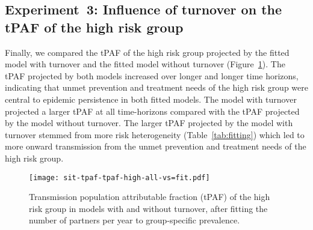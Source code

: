 \subsection{Experiment~3: Influence of turnover on the tPAF of the high risk group}
\label{ss:res-tpaf}
Finally, we compared the tPAF of the high risk group
projected by the fitted model with turnover and the fitted model without turnover
(Figure~\ref{fig:tpaf-fit}).
The tPAF projected by both models
increased over longer and longer time horizons,
indicating that unmet prevention and treatment needs of the high risk group
were central to epidemic persistence in both fitted models.
The model with turnover projected a larger tPAF at all
time-horizons compared with the tPAF projected by the model without turnover.
The larger tPAF projected by the model with turnover
stemmed from more risk heterogeneity (Table~\ref{tab:fitting})
which led to more onward transmission from the unmet
prevention and treatment needs of the high risk group.
\begin{figure}[!tbp]
  \centerline{\texttt{[image: sit-tpaf-tpaf-high-all-vs=fit.pdf]}}
  \caption{Transmission population attributable fraction (tPAF)
    of the high risk group in models with and without turnover,
    after fitting the number of partners per year to group-specific prevalence.}
  \label{fig:tpaf-fit}
\end{figure}